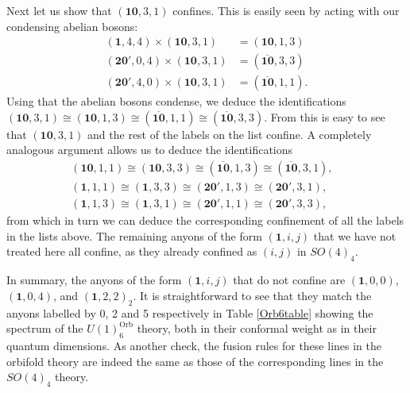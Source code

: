 \documentclass[11pt]{article}
\numberwithin{equation}{section}
\begin{document}
Next let us show that $(\mathbf{10},3,1)$ confines. This is easily seen by acting with our condensing abelian bosons:
\begin{align}
    (\mathbf{1},4,4) \times (\mathbf{10},3,1) &= (\mathbf{10},1,3) \label{144action1031} \\[0.3cm]
    (\mathbf{20}',0,4) \times (\mathbf{10},3,1) &= (\overline{\mathbf{10}},3,3) \\[0.3cm]
    (\mathbf{20}',4,0) \times (\mathbf{10},3,1) &= (\overline{\mathbf{10}},1,1). \label{2040action1031}
\end{align}
Using that the abelian bosons condense, we deduce the identifications $(\mathbf{10},3,1) \cong (\mathbf{10},1,3) \cong (\overline{\mathbf{10}},1,1) \cong (\overline{\mathbf{10}},3,3)$. From this is easy to see that $(\mathbf{10},3,1)$ and the rest of the labels on the list confine. A completely analogous argument 
allows us to deduce the identifications
\begin{align}
    (\mathbf{10},1,1) \cong (\mathbf{10},3,3) \cong (\overline{\mathbf{10}},1,3) \cong (\overline{\mathbf{10}},3,1),& \label{1011ids} \\[0.3cm]
    (\mathbf{1},1,1) \cong (\mathbf{1},3,3) \cong (\mathbf{20}',1,3) \cong (\mathbf{20}',3,1),& \\[0.3cm]
    (\mathbf{1},1,3) \cong (\mathbf{1},3,1) \cong (\mathbf{20}',1,1) \cong (\mathbf{20}',3,3),& \label{113ids}
\end{align}
from which in turn we can deduce the corresponding confinement of all the labels in the lists above. The remaining anyons of the form $(\mathbf{1},i,j)$ that we have not treated here all confine, as they already confined as $(i,j)$ in $SO(4)_{4}$.

In summary, the anyons of the form $(\mathbf{1},i,j)$ that do not confine are $(\mathbf{1},0,0)$, $(\mathbf{1},0,4)$, and $(\mathbf{1},2,2)_{2}$. It is straightforward to see that they match the anyons labelled by 0, 2 and 5 respectively in Table \ref{Orb6table} showing the spectrum of the $U(1)^{\mathrm{Orb}}_{6}$ theory, both in their conformal weight as in their quantum dimensions. As another check, the fusion rules for these lines in the orbifold theory are indeed the same as those of the corresponding lines in the $SO(4)_{4}$ theory. 
\end{document}
